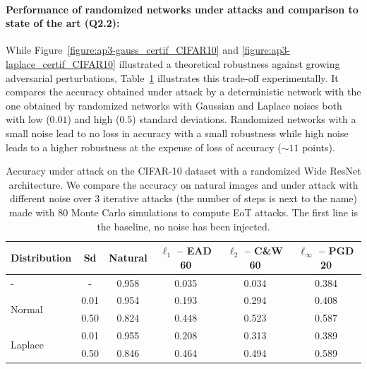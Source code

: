\paragraph{Performance of randomized networks under attacks and comparison to state of the art (Q2.2):}
\label{sec:perf_under_attack}

While Figure~\ref{figure:ap3-gauss_certif_CIFAR10} and \ref{figure:ap3-laplace_certif_CIFAR10} illustrated a theoretical robustness against growing adversarial perturbations, Table~\ref{table:ap3-accuracy_under_attack} illustrates this trade-off experimentally.
It compares the accuracy obtained under attack by a deterministic network with the one obtained by randomized networks with Gaussian and Laplace noises both with low ($0.01$) and high ($0.5$) standard deviations.
Randomized networks with a small noise lead to no loss in accuracy with a small robustness while high noise leads to a higher robustness at the expense of loss of accuracy ($\sim11$ points). 

\begin{table}[t]
  \centering
  \caption{Accuracy under attack on the CIFAR-10 dataset with a randomized Wide ResNet architecture. We compare the accuracy on natural images and under attack with different noise over 3 iterative attacks (the number of steps is next to the name) made with 80 Monte Carlo simulations to compute EoT attacks. The first line is the baseline, no noise has been injected.}
    \begin{tabular}{lccccc}
    \toprule
    \textbf{Distribution} & \textbf{Sd} & \textbf{Natural} & \textbf{$\ell_1$ -- EAD 60} & \textbf{$\ell_2$ -- C\&W 60} & \textbf{$\ell_\infty$ -- PGD 20} \\
    \midrule
    - & - & 0.958 & 0.035 & 0.034 & 0.384 \\
    \midrule
    \multirow{2}[0]{*}{Normal} & 0.01 & 0.954 & 0.193 & 0.294 & 0.408 \\
          & 0.50 & 0.824 & 0.448 & 0.523 & 0.587 \\
    \midrule
    \multirow{2}[0]{*}{Laplace} & 0.01 & 0.955 & 0.208 & 0.313 & 0.389 \\
          & 0.50 & 0.846 & 0.464 & 0.494 & 0.589 \\
    \bottomrule
    \end{tabular}%
  \label{table:ap3-accuracy_under_attack}%
\end{table}%


